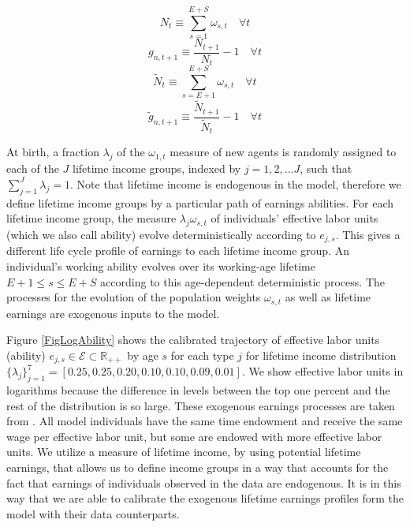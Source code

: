 \documentclass[letterpaper,12pt]{article}
\theoremstyle{definition}
\begin{document}
\begin{spacing}{1.5}
    \begin{equation}\label{EqPopDef}
      N_t\equiv\sum_{s=1}^{E+S} \omega_{s,t} \quad\forall t
    \end{equation}
    \begin{equation}\label{EqPopGrowth}
      g_{n,t+1} \equiv \frac{N_{t+1}}{N_t} - 1 \quad\forall t
    \end{equation}
    \begin{equation}\label{EqPopWkDef}
      \tilde{N}_t\equiv\sum_{s=E+1}^{E+S} \omega_{s,t} \quad\forall t
    \end{equation}
    \begin{equation}\label{EqPopWkGrowth}
      \tilde{g}_{n,t+1} \equiv \frac{\tilde{N}_{t+1}}{\tilde{N}_t} - 1 \quad\forall t
    \end{equation}

    At birth, a fraction $\lambda_j$ of the $\omega_{1,t}$ measure of new agents is randomly assigned to each of the $J$ lifetime income groups, indexed by $j=1,2,...J$, such that $\sum_{j=1}^J\lambda_j=1$. Note that lifetime income is endogenous in the model, therefore we define lifetime income groups by a particular path of earnings abilities. For each lifetime income group, the measure $\lambda_j\omega_{s,t}$ of individuals' effective labor units (which we also call ability) evolve deterministically according to $e_{j,s}$. This gives a different life cycle profile of earnings to each lifetime income group.  An individual's working ability evolves over its working-age lifetime $E+1\leq s \leq E+S$ according to this age-dependent deterministic process. The processes for the evolution of the population weights $\omega_{s,t}$ as well as lifetime earnings are exogenous inputs to the model.

    Figure \ref{FigLogAbility} shows the calibrated trajectory of effective labor units (ability) $e_{j,s}\in\mathcal{E}\subset\mathbb{R}_{++}$ by age $s$ for each type $j$ for lifetime income distribution $\{\lambda_j\}_{j=1}^7 = [0.25,0.25,0.20,0.10,0.10,0.09,0.01]$. We show effective labor units in logarithms because the difference in levels between the top one percent and the rest of the distribution is so large. These exogenous earnings processes are taken from \citet{DEMPRW2015}.  All model individuals have the same time endowment and receive the same wage per effective labor unit, but some are endowed with more effective labor units. We utilize a measure of lifetime income, by using potential lifetime earnings, that allows us to define income groups in a way that accounts for the fact that earnings of individuals observed in the data are endogenous.  It is in this way that we are able to calibrate the exogenous lifetime earnings profiles form the model with their data counterparts.  


\end{spacing}
\end{document}
